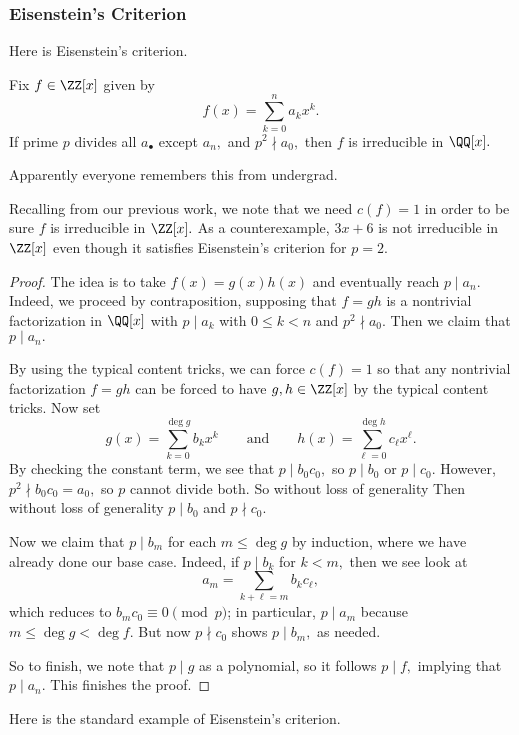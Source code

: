 \documentclass[../notes.tex]{subfiles}
\begin{document}
\subsubsection{Eisenstein's Criterion}
Here is Eisenstein's criterion.
\begin{proposition}[Eisenstein]
	Fix $f\in\ZZ[x]$ given by
	\[f(x)=\sum_{k=0}^na_kx^k.\]
	If prime $p$ divides all $a_\bullet$ except $a_n,$ and $p^2\nmid a_0,$ then $f$ is irreducible in $\QQ[x].$
\end{proposition}
\begin{remark}
	Apparently everyone remembers this from undergrad.
\end{remark}
\begin{remark}[Nir]
	Recalling from our previous work, we note that we need $c(f)=1$ in order to be sure $f$ is irreducible in $\ZZ[x].$ As a counterexample, $3x+6$ is not irreducible in $\ZZ[x]$ even though it satisfies Eisenstein's criterion for $p=2.$
\end{remark}
\begin{proof}
	The idea is to take $f(x)=g(x)h(x)$ and eventually reach $p\mid a_n.$ Indeed, we proceed by contraposition, supposing that $f=gh$ is a nontrivial factorization in $\QQ[x]$ with $p\mid a_k$ with $0\le k<n$ and $p^2\nmid a_0.$ Then we claim that $p\mid a_n.$
	
	By using the typical content tricks, we can force $c(f)=1$ so that any nontrivial factorization $f=gh$ can be forced to have $g,h\in\ZZ[x]$ by the typical content tricks. Now set
	\[g(x)=\sum_{k=0}^{\deg g} b_kx^k\qquad\text{and}\qquad h(x)=\sum_{\ell=0}^{\deg h} c_\ell x^\ell.\]
	By checking the constant term, we see that $p\mid b_0c_0,$ so $p\mid b_0$ or $p\mid c_0.$ However, $p^2\nmid b_0c_0=a_0,$ so $p$ cannot divide both. So without loss of generality Then without loss of generality $p\mid b_0$ and $p\nmid c_0.$
	
	Now we claim that $p\mid b_m$ for each $m\le\deg g$ by induction, where we have already done our base case. Indeed, if $p\mid b_k$ for $k<m,$ then we see look at
	\[a_m=\sum_{k+\ell=m}b_kc_\ell,\]
	which reduces to $b_mc_0\equiv0\pmod p$; in particular, $p\mid a_m$ because $m\le\deg g<\deg f.$ But now $p\nmid c_0$ shows $p\mid b_m,$ as needed.

	So to finish, we note that $p\mid g$ as a polynomial, so it follows $p\mid f,$ implying that $p\mid a_n.$ This finishes the proof.
\end{proof}
Here is the standard example of Eisenstein's criterion.
\end{document}
